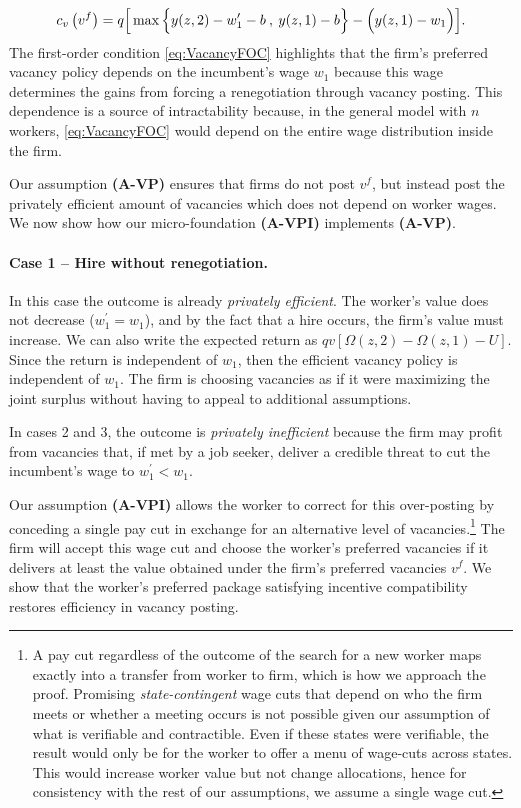 \vspace*{-.3cm}\begin{equation}\label{eq:VacancyFOC}
c_v\left(v^f
\right) =q
\Big[\max \Big\{y(z,2) - w_1^{\prime} - b
\:,\:
y(z,1) - b
\Big\} - \Big( y(z,1) - w_1 \Big) \Big].
\vspace*{-.3cm}\end{equation}
The first-order condition \eqref{eq:VacancyFOC} highlights that the firm's preferred vacancy policy depends on the incumbent's wage $w_1$ because this wage determines the gains from forcing a renegotiation through vacancy posting. This dependence is a source of intractability because, in the general model with $n$ workers, \eqref{eq:VacancyFOC} would depend on the entire wage distribution inside the firm.

Our assumption \textbf{(A-VP)} ensures that firms do not post $v^f$, but instead post the privately efficient amount of vacancies which does not depend on worker wages. We now show how our micro-foundation \textbf{(A-VPI)} implements \textbf{(A-VP)}.

\vspace*{-.2cm}\paragraph{Case 1 -- Hire without renegotiation.}
In this case the outcome is already \emph{privately efficient}. The worker's value does not decrease ($w_1^{\prime}=w_1$), and by the fact that a hire occurs, the firm's value must increase. We can also write the expected return as $qv\left[\Omega(z,2)-\Omega(z,1) - U\right]$. Since the return is independent of $w_1$, then the efficient vacancy policy is independent of $w_1$. The firm is choosing vacancies as if it were maximizing the joint surplus without having to appeal to additional assumptions.

In cases 2 and 3, the outcome is \emph{privately inefficient} because the firm may profit from vacancies that, if met by a job seeker, deliver a credible threat to cut the incumbent's wage to $w_1^\prime <w_1$.

Our assumption \textbf{(A-VPI)} allows the worker to correct for this over-posting by conceding a single pay cut in exchange for an alternative level of vacancies.\footnote{
    A pay cut regardless of the outcome of the search for a new worker maps exactly into a transfer from worker to firm, which is how we approach the proof.
    Promising \emph{state-contingent} wage cuts that depend on who the firm meets or whether a meeting occurs is not possible given our assumption of what is verifiable and contractible.
    Even if these states were verifiable, the result would only be for the worker to offer a menu of wage-cuts across states.
    This would increase worker value but not change allocations, hence for consistency with the rest of our assumptions, we assume a single wage cut.
}
The firm will accept this wage cut and choose the worker's preferred vacancies if it delivers at least the value obtained under the firm's preferred vacancies $v^f$. We show that the worker's preferred package satisfying incentive compatibility restores efficiency in vacancy posting.

